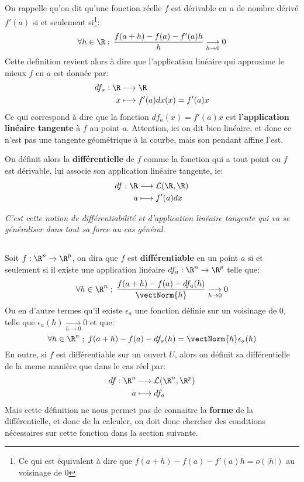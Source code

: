 \subsection*{}
On rappelle qu'on dit qu'une fonction réelle \(f\) est dérivable en \(a\) de nombre dérivé \(f'(a)\) si et seulement si\footnote[2]{Ce qui est équivalent à dire que \(f(a + h) - f(a) - f'(a)h = o(|h|)\) au voisinage de \(0\)}:
\[
   \forall h \in \R \; ; \; \frac{f(a + h) - f(a) - f'(a)h}{h} \underset{h \rightarrow 0}{\longrightarrow} 0
\]
Cette definition revient alors à dire que l'application linéaire qui approxime le mieux \(f\) en \(a\) est donnée par:
\[
   \begin{aligned}
      df_a : \R &\longrightarrow \R\\
      x &\longmapsto f'(a)dx(x) = f'(a)x 
   \end{aligned}  
\]
Ce qui correspond à dire que la fonction \(df_a(x) = f'(a)x\) est \textbf{l'application linéaire tangente} à \(f\) au point \(a\). Attention, ici on dit bien linéaire, et donc ce n'est pas une tangente géométrique à la courbe, mais son pendant affine l'est.\<

On définit alors la \textbf{différentielle} de \(f\) comme la fonction qui a tout point ou \(f\) est dérivable, lui associe son application linéaire tangente, ie:
\[
   \begin{aligned}
      df : \R &\longrightarrow \mathcal{L(\R, \R)}\\
      a &\longmapsto f'(a)dx
   \end{aligned}  
\]
\begin{center}
   \textit{C'est cette notion de différentiabilité et d'application linéaire tangente qui va se généraliser dans tout sa force au cas général.}
\end{center}
\subsection*{}
Soit \(f : \R^n \rightarrow \R^p\), on dira que \(f\) est \textbf{différentiable} en un point \(a\) si et seulement si il existe une application linéaire \(df_a : \R^n \rightarrow \R^p\) telle que:
\[
   \forall h \in \R^n \; ; \; \frac{f(a + h) - f(a) - df_a(h)}{\vectNorm{h}} \underset{h \rightarrow 0}{\longrightarrow} 0
\]
Ou en d'autre termes qu'il existe \(\epsilon_a\) une fonction définie sur un voisinage de \(0\), telle que \(\epsilon_a(h) \underset{h \rightarrow 0}{\rightarrow} 0\) et que: 
\[
   \forall h \in \R^n \; ; \; f(a + h) - f(a) - df_a(h) = \vectNorm{h}\epsilon_a(h)
\]
En outre, si \(f\) est différentiable sur un ouvert \(U\), alors on définit sa différentielle de la meme manière que dans le cas réel par:
\[
   \begin{aligned}
      df : \R^n &\longrightarrow \mathcal{L}(\R^n, \R^p)\\
      a &\longmapsto df_a
   \end{aligned}  
\]
Mais cette définition ne nous permet pas de connaitre la \textbf{forme} de la différentielle, et donc de la calculer, on doit donc chercher des conditions nécessaires sur cette fonction dans la section suivante. 

